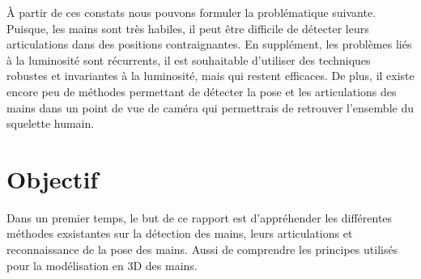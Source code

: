 À partir de ces constats nous pouvons formuler la problématique 
suivante. Puisque, 
les mains sont très habiles, il peut être difficile de détecter leurs 
articulations dans des positions contraignantes. En supplément, les 
problèmes liés à la luminosité sont récurrents, il est souhaitable 
d'utiliser des techniques robustes et invariantes à la luminosité, 
mais qui restent efficaces. De plus, il existe encore peu de méthodes 
permettant de détecter la pose et les articulations des mains dans 
un point de vue de caméra qui permettrais de retrouver l'ensemble du
squelette humain.

\section{Objectif}
%
%
%
%

Dans un premier temps, le but de ce rapport est d'appréhender les 
différentes méthodes exsistantes sur la détection des mains, leurs 
articulations et reconnaissance de la pose des mains. Aussi de 
comprendre les principes utilisés pour la modélisation en 3D des 
mains.\\ 

